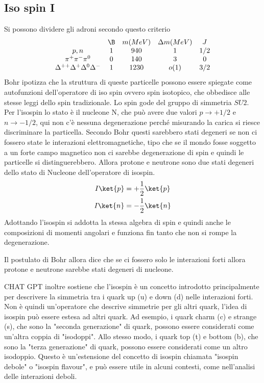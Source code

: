 \documentclass[12pt]{book}
\begin{document}
\subsection{Iso spin I}
Si possono dividere gli adroni secondo questo criterio
\begin{equation}
	\begin{matrix}
		& \B& m (MeV)& \Delta m (MeV) & J\\
		p , n & 1 & 940 & 1 & 1/2 \\
		\pi^+ \pi^- \pi^0 & 0 & 140 & 3 & 0\\
		\Delta^{++} \Delta^+ \Delta^0 \Delta^- & 1 & 1230 & o(1) & 3/2
	\end{matrix}
\end{equation}
Bohr ipotizza che la struttura di queste particelle possono essere spiegate come autofunzioni dell'operatore di iso spin ovvero spin isotopico, che obbedisce alle stesse leggi dello spin tradizionale. Lo spin gode del gruppo di simmetria $SU2$. Per l'isospin lo stato è il nucleone N, che può avere due valori $p \rightarrow +1/2$ e $n \rightarrow -1/2$, qui non c'è nessuna degenerazione perché misurando la carica si riesce discriminare la particella. Secondo Bohr questi sarebbero stati degeneri se non ci fossero state le interazioni elettromagnetiche, tipo che se il mondo fosse soggetto a un forte campo magnetico non ci sarebbe degenerazione di spin e quindi le particelle si distinguerebbero. Allora protone e neutrone sono due stati degeneri dello stato di Nucleone dell'operatore di isospin.
\begin{gather}
	I \ket{p} = +\frac{1}{2} \ket{p}\\
	I \ket{n} = -\frac{1}{2} \ket{n}
\end{gather}
Adottando l'isospin si addotta la stessa algebra di spin e quindi anche le composizioni di momenti angolari e funziona fin tanto che non si rompe la degenerazione. 


Il postulato di Bohr allora dice che se ci fossero solo le interazioni forti allora protone e neutrone sarebbe stati degeneri di nucleone. 

CHAT GPT inoltre sostiene che l'isospin è un concetto introdotto principalmente per descrivere la simmetria tra i quark up (u) e down (d) nelle interazioni forti. Non è quindi un'operatore che descrive simmetrie per gli altri quark, l'idea di isospin può essere estesa ad altri quark. Ad esempio, i quark charm (c) e strange (s), che sono la "seconda generazione" di quark, possono essere considerati come un'altra coppia di "isodoppi". Allo stesso modo, i quark top (t) e bottom (b), che sono la "terza generazione" di quark, possono essere considerati come un altro isodoppio. Questo è un'estensione del concetto di isospin chiamata "isospin debole" o "isospin flavour", e può essere utile in alcuni contesti, come nell'analisi delle interazioni deboli.
\end{document}
